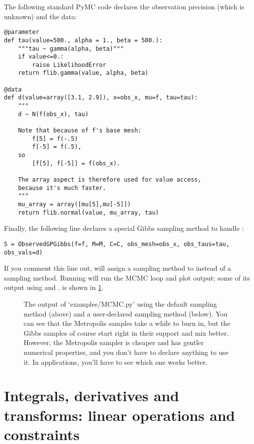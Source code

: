 \documentclass{manual}
\begin{document}
The following standard PyMC code declares the observation precision (which is unknown) and the data:
\begin{verbatim}
@parameter
def tau(value=500., alpha = 1., beta = 500.):
    """tau ~ gamma(alpha, beta)"""
    if value<=0.:
        raise LikelihoodError
    return flib.gamma(value, alpha, beta)

@data
def d(value=array([3.1, 2.9]), x=obs_x, mu=f, tau=tau):
    """
    d ~ N(f(obs_x), tau)

    Note that because of f's base mesh:
        f[5] = f(-.5)
        f[-5] = f(.5),
    so
        [f[5], f[-5]] = f(obs_x).
        
    The array aspect is therefore used for value access,
    because it's much faster.
    """
    mu_array = array([mu[5],mu[-5]])
    return flib.normal(value, mu_array, tau)
\end{verbatim}

Finally, the following line declares a special Gibbs sampling method to handle :
\begin{verbatim}
S = ObservedGPGibbs(f=f, M=M, C=C, obs_mesh=obs_x, obs_taus=tau, obs_vals=d)
\end{verbatim}
If you comment this line out,  will assign a  sampling method to  instead of a  sampling method. Running  will run the MCMC loop and plot output; some of its output using  and . is shown in \ref{fig:MCMCOutput}. 

\begin{figure}
	\centering
	\caption{The output of {\sffamily `examples/MCMC.py'} using the default  sampling method (above) and a user-declared  sampling method (below). You can see that the Metropolis samples take a while to burn in, but the Gibbs samples of course start right in their support and mix better. However, the Metropolis sampler is cheaper and has gentler numerical properties, and you don't have to declare anything to use it. In applications, you'll have to see which one works better.}
	\label{fig:MCMCOutput}
\end{figure} 

\section{Integrals, derivatives and transforms: linear operations and constraints}\label{sec:linop} %
\end{document}
